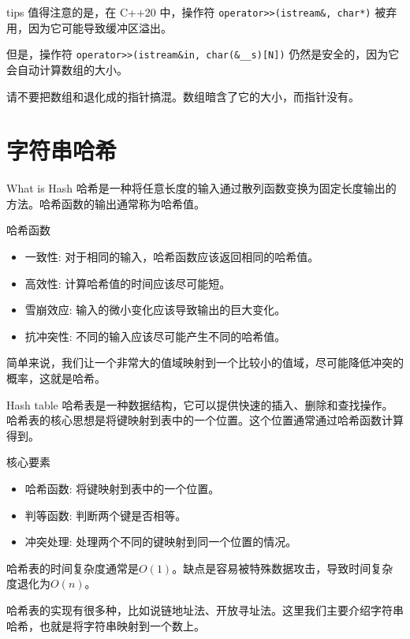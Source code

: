 \documentclass{ldr-simple-gray}
\begin{document}
  \begin{frame}{tips}
    值得注意的是，在 C++20 中，操作符 \texttt{operator>>(istream\&, char*)} 被弃用，因为它可能导致缓冲区溢出。\newline

    但是，操作符 \texttt{operator>>(istream\&in, char(\&\_\_s)[N])} 仍然是安全的，因为它会自动计算数组的大小。\newline
    
    请不要把数组和退化成的指针搞混。数组暗含了它的大小，而指针没有。
  \end{frame}
  
  \section{字符串哈希}
  \begin{frame}{What is Hash}
    哈希是一种将任意长度的输入通过散列函数变换为固定长度输出的方法。哈希函数的输出通常称为哈希值。
    \begin{block}{哈希函数}
      \begin{itemize}
        \item 一致性: 对于相同的输入，哈希函数应该返回相同的哈希值。
        \item 高效性: 计算哈希值的时间应该尽可能短。
        \item 雪崩效应: 输入的微小变化应该导致输出的巨大变化。
        \item 抗冲突性: 不同的输入应该尽可能产生不同的哈希值。
      \end{itemize}
    \end{block}
    简单来说，我们让一个非常大的值域映射到一个比较小的值域，尽可能降低冲突的概率，这就是哈希。
  \end{frame}

  \begin{frame}{Hash table}
    哈希表是一种数据结构，它可以提供快速的插入、删除和查找操作。哈希表的核心思想是将键映射到表中的一个位置。这个位置通常通过哈希函数计算得到。

    \begin{block}{核心要素}
      \begin{itemize}
        \item 哈希函数: 将键映射到表中的一个位置。
        \item 判等函数: 判断两个键是否相等。
        \item 冲突处理: 处理两个不同的键映射到同一个位置的情况。
      \end{itemize}
      哈希表的时间复杂度通常是$O(1)$。缺点是容易被特殊数据攻击，导致时间复杂度退化为$O(n)$。
    \end{block}

    哈希表的实现有很多种，比如说链地址法、开放寻址法。这里我们主要介绍字符串哈希，也就是将字符串映射到一个数上。
  \end{frame}
\end{document}
